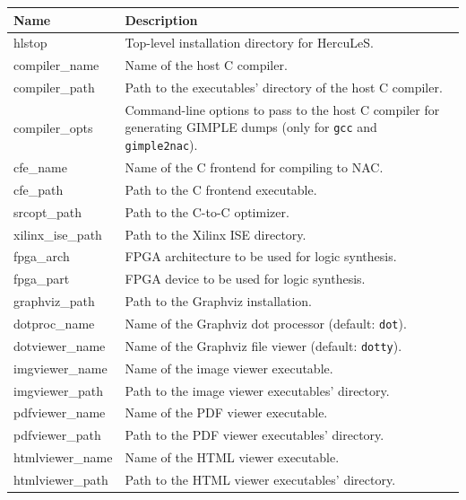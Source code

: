 \documentclass[a4paper]{article}
\newlength{\DUtablewidth} %
\begin{document}
\setlength{\DUtablewidth}{\linewidth}
\begin{longtable*}[c]{|p{0.261\DUtablewidth}|p{0.668\DUtablewidth}|}
\hline

Name
 & 
Description
 \\
\hline

hlstop
 & 
Top-level installation directory for HercuLeS.
 \\
\hline

compiler\_name
 & 
Name of the host C compiler.
 \\
\hline

compiler\_path
 & 
Path to the executables' directory of the host C
compiler.
 \\
\hline

compiler\_opts
 & 
Command-line options to pass to the host C compiler for
generating GIMPLE dumps (only for \texttt{gcc} and
\texttt{gimple2nac}).
 \\
\hline

cfe\_name
 & 
Name of the C frontend for compiling to NAC.
 \\
\hline

cfe\_path
 & 
Path to the C frontend executable.
 \\
\hline

srcopt\_path
 & 
Path to the C-to-C optimizer.
 \\
\hline

xilinx\_ise\_path
 & 
Path to the Xilinx ISE directory.
 \\
\hline

fpga\_arch
 & 
FPGA architecture to be used for logic synthesis.
 \\
\hline

fpga\_part
 & 
FPGA device to be used for logic synthesis.
 \\
\hline

graphviz\_path
 & 
Path to the Graphviz installation.
 \\
\hline

dotproc\_name
 & 
Name of the Graphviz dot processor (default: \texttt{dot}).
 \\
\hline

dotviewer\_name
 & 
Name of the Graphviz file viewer (default: \texttt{dotty}).
 \\
\hline

imgviewer\_name
 & 
Name of the image viewer executable.
 \\
\hline

imgviewer\_path
 & 
Path to the image viewer executables' directory.
 \\
\hline

pdfviewer\_name
 & 
Name of the PDF viewer executable.
 \\
\hline

pdfviewer\_path
 & 
Path to the PDF viewer executables' directory.
 \\
\hline

htmlviewer\_name
 & 
Name of the HTML viewer executable.
 \\
\hline

htmlviewer\_path
 & 
Path to the HTML viewer executables' directory.
 \\
\hline
\end{longtable*}
\end{document}
